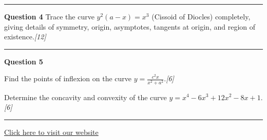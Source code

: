 \documentclass[11pt,a4paper]{article}
\newcommand{\pts}[1]{\hfill   \textit{[#1]}}
\begin{document}
\medskip\rule{\linewidth}{0.2pt}\medskip




\noindent   \textbf{Question 4}
Trace the curve $y^2(a - x) = x^3$ (Cissoid of Diocles) completely, giving details of symmetry, origin, asymptotes, tangents at origin, and region of existence.\pts{12}

\medskip\rule{\linewidth}{0.2pt}\medskip




\noindent   \textbf{Question 5}

\begin{parts}
  \item Find the points of inflexion on the curve $y = \frac{c^2 x}{x^2 + a^2}$.\pts{6}
  \item Determine the concavity and convexity of the curve $y = x^4 - 6x^3 + 12x^2 - 8x + 1$.\pts{6}
\end{parts}

\vfill\rule{\linewidth}{0.4pt}

\begin{center}\small\href{https://bhu-exam.vercel.app/}{Click here to visit our website}\end{center}
\end{document}
